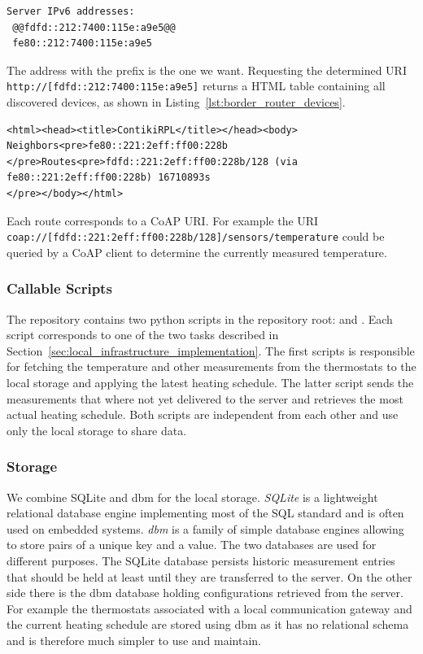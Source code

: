 \begin{lstlisting}[numbers=none, moredelim={[is][keywordstyle]{@@}{@@}}]
Server IPv6 addresses:
 @@fdfd::212:7400:115e:a9e5@@
 fe80::212:7400:115e:a9e5
\end{lstlisting}

The address with the prefix  is the one we want. Requesting the determined URI \nolinkurl{http://[fdfd::212:7400:115e:a9e5]} returns a HTML table containing all discovered devices, as shown in Listing~\ref{lst:border_router_devices}.

\begin{lstlisting}[label={lst:border_router_devices}, caption={Example of routing table provided by the border routers web service}]
<html><head><title>ContikiRPL</title></head><body>
Neighbors<pre>fe80::221:2eff:ff00:228b
</pre>Routes<pre>fdfd::221:2eff:ff00:228b/128 (via fe80::221:2eff:ff00:228b) 16710893s
</pre></body></html>
\end{lstlisting}

Each route corresponds to a CoAP URI. For example the URI \nolinkurl{coap://[fdfd::221:2eff:ff00:228b/128]/sensors/temperature} could be queried by a CoAP client to determine the currently measured temperature.


\subsubsection{Callable Scripts}

The  repository contains two python scripts in the repository root:  and .
Each script corresponds to one of the two tasks described in Section~\ref{sec:local_infrastructure_implementation}.
The first scripts is responsible for fetching the temperature and other measurements from the thermostats to the local storage and applying the latest heating schedule.
The latter script sends the measurements that where not yet delivered to the server and retrieves the most actual heating schedule. Both scripts are independent from each other and use only the local storage to share data.

\subsubsection{Storage}

We combine SQLite and dbm for the local storage.
\emph{SQLite} is a lightweight relational database engine implementing most of the SQL standard and is often used on embedded systems.
\emph{dbm} is a family of simple database engines allowing to store pairs of a unique key and a value.
The two databases are used for different purposes.
The SQLite database persists historic measurement entries that should be held at least until they are transferred to the server.
On the other side there is the dbm database holding configurations retrieved from the server.
For example the thermostats associated with a local communication gateway and the current heating schedule are stored using dbm as it has no relational schema and is therefore much simpler to use and maintain.

